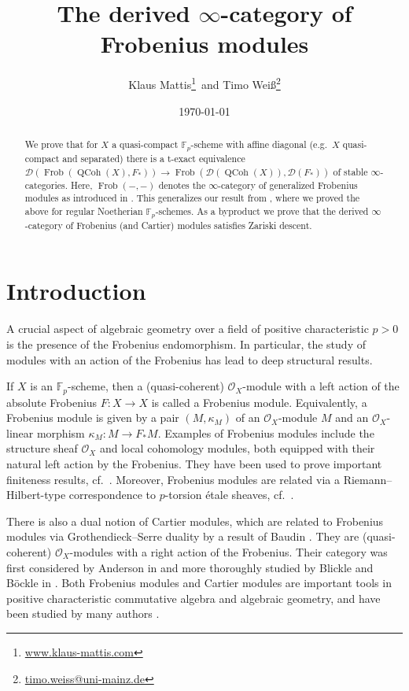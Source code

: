 \documentclass{article}
\date{\today}
\author{Klaus Mattis\footnote{\href{http://www.klaus-mattis.com}{www.klaus-mattis.com}}\, and Timo Weiß\footnote{\href{mailto:timo.weiss@uni-mainz.de}{timo.weiss@uni-mainz.de}}}
\title{The derived \texorpdfstring{$\infty$}{infinity}-category of Frobenius modules}
\theoremstyle{definition}
\theoremstyle{definition}
\theoremstyle{definition}
\theoremstyle{plain}
\theoremstyle{plain}
\theoremstyle{plain}
\theoremstyle{plain}
\theoremstyle{plain}
\theoremstyle{plain}
\theoremstyle{plain}
\theoremstyle{plain}
\theoremstyle{remark}
\theoremstyle{remark}
\theoremstyle{plain}
\theoremstyle{plain}
\theoremstyle{plain}
\theoremstyle{plain}
\theoremstyle{plain}
\newcommand{\Fp}{\mathbb{F}_p}
\newcommand{\QCoh}[1]{\operatorname{QCoh}(#1)}
\newcommand{\Frob}[2]{\operatorname{Frob}(#1, #2)}
\newcommand{\Cat}[1]{\mathcal{#1}}
\newcommand{\OX}{\mathcal{O}_X}
\begin{document}
\maketitle 

\begin{abstract}
    We prove that for $X$ a quasi-compact $\Fp$-scheme with affine diagonal (e.g.\ $X$ quasi-compact 
    and separated) there is a t-exact equivalence 
    $\Cat D(\Frob{\QCoh{X}}{F_*}) \to \Frob{\Cat D(\QCoh{X})}{\Cat D(F_*)}$
    of stable $\infty$-categories.
    Here, $\Frob{-}{-}$ denotes the $\infty$-category of generalized Frobenius modules 
    as introduced in \cite{cartmod}.
    This generalizes our result from \cite{cartmod},
    where we proved the above for regular Noetherian $\Fp$-schemes.
    As a byproduct we prove that the derived $\infty$-category of Frobenius (and Cartier) modules
    satisfies Zariski descent.
\end{abstract}

\hypersetup{pdfborder=0 0 0}
\tableofcontents
\hypersetup{pdfborder=1 1 1}
\newpage


\section{Introduction}

A crucial aspect of algebraic geometry over a field of positive characteristic $p > 0$ is the presence of the Frobenius endomorphism. 
In particular, the study of modules with an action of the Frobenius has lead to deep structural results.

If $X$ is an $\Fp$-scheme, then a (quasi-coherent) $\OX$-module with a left action of the absolute Frobenius $F\colon X \to X$ is called a Frobenius module. 
Equivalently, a Frobenius module is given by a pair $(M, \kappa_M)$ of an $\OX$-module $M$
and an $\OX$-linear morphism $\kappa_M \colon M \to F_*M$.
Examples of Frobenius modules include the structure sheaf $\OX$ and local cohomology modules,
both equipped with their natural left action by the Frobenius.
They have been used to prove important finiteness results, cf.\ \cite{hartshornespeiser, lyubeznik1997f}.
Moreover, Frobenius modules are related via a Riemann--Hilbert-type correspondence to $p$-torsion étale sheaves, 
cf.\ \cite{emerton2004riemann, bhatt2017riemannhilbertcorrespondencepositivecharacteristic,bockle2014cohomological}. 

There is also a dual notion of Cartier modules, which are related to Frobenius modules via Grothendieck--Serre duality by a result of Baudin \cite[Theorem 4.2.7]{baudin2025dualitycartiercrystalsperverse}. 
They are (quasi-coherent) $\OX$-modules with a right action of the Frobenius. Their category was first considered by Anderson in \cite{Anderson} and more thoroughly studied by Blickle and Böckle in \cite{blickle2011cartier,blickle2013cartier}. 
Both Frobenius modules and Cartier modules are important tools in positive characteristic commutative algebra and algebraic geometry,
and have been studied by many authors \cite{lyubeznik2001commutation,schwede2009f,patakfalvi2016frobeniustechniquesbirationalgeometry,99bc2f14-cf95-3c44-a77d-e80ab3dcf24f}.
\end{document}

